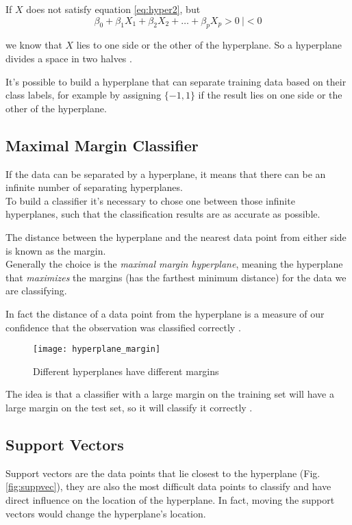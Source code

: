 If $X$ does not satisfy equation \ref{eq:hyper2}, but
\begin{equation} \label{eq:hyper3}
\beta_0 + \beta_1 X_1 + \beta_2 X_2 + \dots + \beta_p X_p > 0 \ | < 0
\end{equation}

we know that $X$ lies to one side or the other of the hyperplane. So a hyperplane divides a space in two halves \cite{ISLR}.

It's possible to build a hyperplane that can separate training data based on their class labels, for example by assigning $\{-1, 1\}$ if the result lies on one side or the other of the hyperplane.

\subsection{Maximal Margin Classifier}
If the data can be separated by a hyperplane, it means that there can be an infinite number of separating hyperplanes. \\
To build a classifier it's necessary to chose one between those infinite hyperplanes, such that the classification results are as accurate as possible.

The distance between the hyperplane and the nearest data point from either side is known as the margin.\\
Generally the choice is the \textit{maximal margin hyperplane}, meaning the hyperplane that \textit{maximizes} the margins (has the farthest minimum distance) for the data we are classifying.

In fact the distance of a data point from the hyperplane is a measure of our confidence that the observation was classified correctly \cite{ISLR}.

\begin{figure}[H]
	\centering
	\texttt{[image: hyperplane\_margin]}
	\caption{Different hyperplanes have different margins \cite{svm_monkeylearn}}
\end{figure}

The idea is that a classifier with a large margin on the training set will have a large margin on the test set, so it will classify it correctly \cite{ISLR}.

\subsection{Support Vectors}
Support vectors are the data points that lie closest to the hyperplane (Fig. \ref{fig:suppvec}), they are also the most difficult data points to classify and have direct influence on the location of the hyperplane. In fact, moving the support vectors would change the hyperplane's location.

